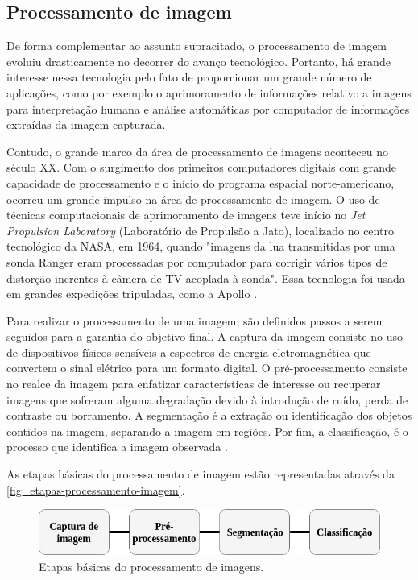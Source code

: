 \subsection{Processamento de imagem}

De forma complementar ao assunto supracitado, o processamento de imagem evoluiu drasticamente no decorrer do avanço tecnológico. Portanto, há grande interesse nessa tecnologia pelo fato de proporcionar um grande número de aplicações, como por exemplo o aprimoramento de informações relativo a imagens para interpretação humana e análise automáticas por computador de informações extraídas da imagem capturada.

Contudo, o grande marco da área de processamento de imagens aconteceu no século XX. Com o surgimento dos primeiros computadores digitais com grande capacidade de processamento e o início do programa espacial norte-americano, ocorreu um grande impulso na área de processamento de imagem. O uso de técnicas computacionais de aprimoramento de imagens teve início no \textit{Jet Propulsion Laboratory} (Laboratório de Propulsão a Jato), localizado no centro tecnológico da NASA, em 1964, quando "imagens da lua transmitidas por uma sonda Ranger eram processadas por computador para corrigir vários tipos de distorção inerentes à câmera de TV acoplada à sonda". Essa tecnologia foi usada em grandes expedições tripuladas, como a Apollo \cite{FILHO1999}.

Para realizar o processamento de uma imagem, são definidos passos a serem seguidos para a garantia do objetivo final. A captura da imagem consiste no uso de dispositivos físicos sensíveis a espectros de energia eletromagnética que convertem o sinal elétrico para um formato digital. O pré-processamento consiste no realce da imagem para enfatizar características de interesse ou recuperar imagens que sofreram alguma degradação devido à introdução de ruído, perda de contraste ou borramento. A segmentação é a extração ou identificação dos objetos contidos na imagem, separando a imagem em regiões. Por fim, a classificação, é o processo que identifica a imagem observada \cite{GONZALEZ2002}.

As etapas básicas do processamento de imagem estão representadas através da \autoref{fig_etapas-processamento-imagem}.

\begin{figure}[h]
	\caption{\label{fig_etapas-processamento-imagem}Etapas básicas do processamento de imagens.}
	\begin{center}
		\includegraphics[scale=0.5]{4-Conteudo-Bibliografico/2-Visao-Computacional/Imagens-Visao-Computacional/etapas-processamento-imagem.jpg}
	\end{center}
	\centering {}
\end{figure}


